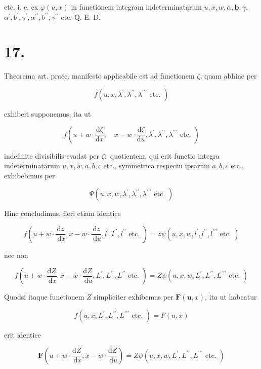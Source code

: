 \documentclass[10pt]{article}
\begin{document}
etc. i. e. ex \(\varphi(u, x)\) in functionem integram indeterminatarum \(u, x, w, \alpha, \boldsymbol{b}, \gamma\), \(\alpha^{\prime}, b^{\prime}, \gamma^{\prime}, \alpha^{\prime \prime}, b^{\prime \prime}, \gamma^{\prime \prime}\) etc. Q. E. D.

\section*{17.}
Theorema art. praec. manifesto applicabile est ad functionem \(\zeta\), quam abhinc per

\[
f\left(u, x, \lambda^{\prime}, \lambda^{\prime \prime}, \lambda^{\prime \prime \prime} \text { etc. }\right)
\]

exhiberi supponemus, ita ut

\[
f\left(u+w \cdot \frac{\mathrm{d} \zeta}{\mathrm{d} x}, \quad x-w \cdot \frac{\mathrm{d} \zeta}{\mathrm{d} u}, \lambda^{\prime}, \lambda^{\prime \prime}, \lambda^{\prime \prime \prime} \text { etc. }\right)
\]

indefinite divisibilis evadat per \(\zeta:\) quotientem, qui erit functio integra indeterminatarum \(u, x, w, a, b, c\) etc., symmetrica respectu ipsarum \(a, b, c\) etc., exhibebimus per

\[
\Psi\left(u, x, w, \lambda^{\prime}, \lambda^{\prime \prime}, \lambda^{\prime \prime \prime} \text { etc. }\right)
\]

Hinc concludimus, fieri etiam identice

\[
f\left(u+w \cdot \frac{\mathrm{d} z}{\mathrm{~d} x}, x-w \cdot \frac{\mathrm{d} z}{\mathrm{~d} u}, l^{\prime}, l^{\prime \prime}, l^{\prime \prime} \text { etc. }\right)=z \psi\left(u, x, w, l^{\prime}, l^{\prime \prime}, l^{\prime \prime \prime} \text { etc. }\right)
\]

nec non

\[
f\left(u+w \cdot \frac{\mathrm{d} Z}{\mathrm{~d} x}, x-w \cdot \frac{\mathrm{d} Z}{\mathrm{~d} u}, L^{\prime}, L^{\prime \prime}, L^{\prime \prime} \text { etc. }\right)=Z \psi\left(u, x, w, L^{\prime}, L^{\prime \prime}, L^{\prime \prime \prime} \text { etc. }\right)
\]

Quodsi itaque functionem \(Z\) simpliciter exhibemus per \(\boldsymbol{F}(\boldsymbol{u}, x)\), ita ut habeatur

\[
f\left(u, x, L^{\prime}, L^{\prime \prime}, L^{\prime \prime \prime} \text { etc. }\right)=F(u, x)
\]

erit identice

\[
\boldsymbol{F}\left(u+w \cdot \frac{\mathrm{d} Z}{\mathrm{~d} x}, x-w \cdot \frac{\mathrm{d} Z}{\mathrm{~d} u}\right)=Z \psi\left(u, x, w, L^{\prime}, L^{\prime \prime}, L^{\prime \prime \prime} \text { etc. }\right)
\]
\end{document}
